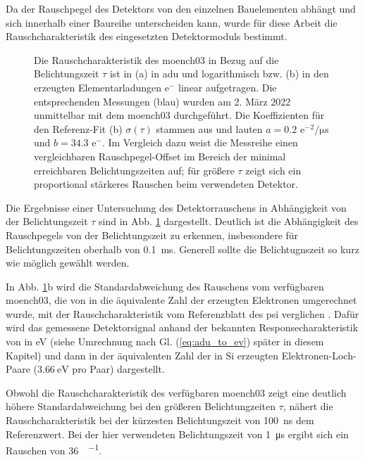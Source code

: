 \noindent
Da der Rauschpegel des Detektors von den einzelnen Bauelementen abhängt und sich innerhalb einer Baureihe unterscheiden kann, wurde für diese Arbeit die  Rauschcharakteristik des eingesetzten Detektormoduls bestimmt.
\begin{figure}[H]
    \centering
    
    \caption{Die Rauschcharakteristik des \gls{moench03} in Bezug auf die Belichtungszeit $\tau$ ist in (a) in \gls{adu} und logarithmisch bzw. (b) in den erzeugten Elementarladungen e$^-$ linear aufgetragen. Die entsprechenden Messungen (blau) wurden am 2. März 2022 unmittelbar mit dem \gls{moench03} durchgeführt. Die Koeffizienten für den Referenz-Fit (b) $\sigma(\tau)$ stammen aus \cite{ramilli-measurements-2017} und lauten $a=\num{0,2}$ e${^-}^2\si{\per\micro\second}$ und $b=\num{34.3}$ e${^-}$. Im Vergleich dazu weist die Messreihe einen vergleichbaren Rauschpegel-Offset im Bereich der minimal erreichbaren Belichtungszeiten auf; für größere $\tau$ zeigt sich ein proportional stärkeres Rauschen beim verwendeten Detektor.}
    \label{fig:noise_moench}
\end{figure}
\noindent
Die Ergebnisse einer Untersuchung des Detektorrauschens in Abhängigkeit von der Belichtungszeit $\tau$ sind in Abb. \ref{fig:noise_moench} dargestellt. Deutlich ist die Abhängigkeit des Rauschpegels von der Belichtungszeit zu erkennen, insbesondere für Belichtungszeiten oberhalb von \SI{0.1}{\milli\second}. Generell sollte die Belichtugnszeit so kurz wie möglich gewählt werden.

\noindent
In Abb. \ref{fig:noise_moench}b wird die Standardabweichung des Rauschens vom verfügbaren \gls{moench03}, die von \si{\adu} in die äquivalente Zahl der erzeugten Elektronen umgerechnet wurde, mit der Rauschcharakteristik vom Referenzblatt des \gls{psi} verglichen \cite{ramilli-measurements-2017}. Dafür wird das gemessene Detektorsignal anhand der bekannten Responsecharakteristik von \si{\adu} in \si{\eV} (siehe Umrechnung nach Gl. (\ref{eq:adu_to_ev}) später in diesem Kapitel) und dann in der äquivalenten Zahl der in Si erzeugten Elektronen-Loch-Paare ($\SI{3,66}{\eV}$ pro Paar) \cite{scholze_mean_1998} dargestellt.

\noindent
Obwohl die Rauschcharakteristik des verfügbaren \gls{moench03} zeigt eine deutlich höhere Standardabweichung bei den größeren Belichtungzeiten $\tau$, nähert die Rauschcharakteristik bei der kürzesten Belichtungszeit von \SI{100}{\nano\second} dem Referenzwert. Bei der hier verwendeten Belichtungszeit von \SI{1}{\micro\second} ergibt sich ein Rauschen von \SI[per-mode=symbol]{36}{\electron\per\pixel}.

